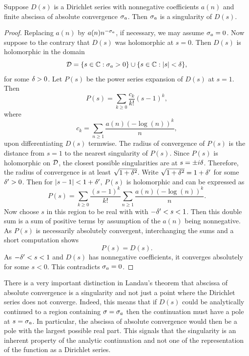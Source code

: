     \begin{theorem*}
      Suppose \(D(s)\) is a Dirichlet series with nonnegative coefficients \(a(n)\) and finite abscissa of absolute convergence \(\sigma_{a}\). Then \(\sigma_{a}\) is a singularity of \(D(s)\).
    \end{theorem*}
    \begin{proof}
      Replacing \(a(n)\) by \(a(n)n^{-\sigma_{a}}\), if necessary, we may assume \(\sigma_{a} = 0\). Now suppose to the contrary that \(D(s)\) was holomorphic at \(s = 0\). Then \(D(s)\) is holomorphic in the domain
      \[
        \mathcal{D} = \{s \in \mathbb{C}:\sigma_{a} > 0\} \cup \{s \in \mathbb{C}:|s| < \delta\},
      \]
      for some \(\delta > 0\). Let \(P(s)\) be the power series expansion of \(D(s)\) at \(s = 1\). Then
      \[
        P(s) = \sum_{k \ge 0}\frac{c_{k}}{k!}(s-1)^{k},
      \]
      where
      \[
        c_{k} = \sum_{n \ge 1}\frac{a(n)(-\log(n))^{k}}{n},
      \]
      upon differentiating \(D(s)\) termwise. The radius of convergence of \(P(s)\) is the distance from \(s = 1\) to the nearest singularity of \(P(s)\). Since \(P(s)\) is holomorphic on \(\mathcal{D}\), the closest possible singularities are at \(s = \pm i\delta\). Therefore, the radius of convergence is at least \(\sqrt{1+\delta^{2}}\). Write \(\sqrt{1+\delta^{2}} = 1+\delta'\) for some \(\delta' > 0\). Then for \(|s-1| < 1+\delta'\), \(P(s)\) is holomorphic and can be expressed as
      \[
        P(s) = \sum_{k \ge 0}\frac{(s-1)^{k}}{k!}\sum_{n \ge 1}\frac{a(n)(-\log(n))^{k}}{n}.
      \]
      Now choose \(s\) in this region to be real with with \(-\delta' < s < 1\). Then this double sum is a sum of positive terms by assumption of the \(a(n)\) being nonnegative. As \(P(s)\) is necessarily absolutely convergent, interchanging the sums and a short computation shows
      \[
        P(s) = D(s).
      \]
      As \(-\delta' < s < 1\) and \(D(s)\) has nonnegative coefficients, it converges absolutely for some \(s < 0\). This contradicts \(\sigma_{a} = 0\).
    \end{proof}

    There is a very important distinction in Landau's theorem that abscissa of absolute convergence is a singularity and not just a point where the Dirichlet series does not converge. Indeed, this means that if \(D(s)\) could be analytically continued to a region containing \(\sigma = \sigma_{a}\) then the continuation must have a pole at \(s = \sigma_{a}\). In particular, the abscissa of absolute convergence would then be a pole with the largest possible real part. This signals that the singularity is an inherent property of the analytic continuation and not one of the representation of the function as a Dirichlet series.
